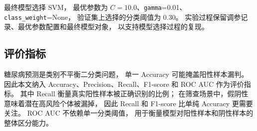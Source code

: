 最终模型选择 SVM，
最优参数为 $C=10.0$、\texttt{gamma}=0.01、
\texttt{class\_weight}=None，
验证集上选择的分类阈值为 0.30。
实验过程保留调参记录、最优参数配置和最终模型对象，
以支持模型选择过程的复现。
\FloatBarrier

\subsection{评价指标}

糖尿病预测是类别不平衡二分类问题，
单一 Accuracy 可能掩盖阳性样本漏判。
因此本文纳入 Accuracy、Precision、Recall、F1-score 和 ROC AUC 作为评价指标。
其中 Recall 衡量真实阳性样本被正确识别的比例；
在筛查场景中，假阴性意味着潜在高风险个体被漏掉，
因此 Recall 和 F1-score 比单纯 Accuracy 更需要关注。
ROC AUC 不依赖单一分类阈值，
用于衡量模型对阳性样本和阴性样本的整体区分能力。
